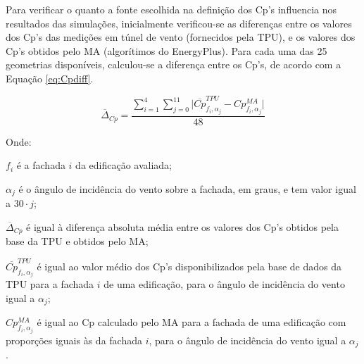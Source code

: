 \documentclass[brazil,hardcopy,openany,a5paper]{ufscthesis}
\begin{document}
		Para verificar o quanto a fonte escolhida na definição dos Cp's influencia nos resultados das simulações, inicialmente verificou-se as diferenças entre os valores dos Cp's das medições em túnel de vento (fornecidos pela TPU), e os valores dos Cp's obtidos pelo MA (algorítimos do EnergyPlus). Para cada uma das 25 geometrias disponíveis, calculou-se a diferença entre os Cp's, de acordo com a Equação \ref{eq:Cpdiff}.
		
		\begin{equation}
		\label{eq:Cpdiff}
		\overline{\Delta}_{Cp} = \frac{\sum_{i=1}^{4}{\sum_{j=0}^{11}{|\overline{Cp}^{TPU}_{f_i,\alpha_j} - Cp^{MA}_{f_i,\alpha_j}}|}}{48}
		\end{equation}
		
		Onde:
		
		$f_i$ é a fachada $i$ da edificação avaliada;
		
		
		$\alpha_j$ é o ângulo de incidência do vento  sobre a fachada, em graus, e tem valor igual a $30 \cdot j$;
		
		$\overline{\Delta}_{Cp}$ é igual à diferença absoluta média entre os valores dos Cp's obtidos pela base da TPU e obtidos pelo MA;
		
		$\overline{Cp}^{TPU}_{f_i,\alpha_j}$ é igual ao valor médio dos Cp's disponibilizados pela base de dados da TPU para a fachada $i$ de uma edificação, para o ângulo de incidência do vento igual a $\alpha_j$;
		
		$Cp^{MA}_{f_i,\alpha_j}$ é igual ao Cp calculado pelo MA para a fachada de uma edificação com proporções iguais às da fachada $i$, para o ângulo de incidência do vento igual a $\alpha_j$.
		\\
		
\end{document}
